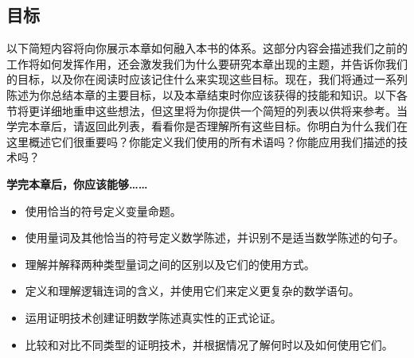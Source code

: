 \subsection{目标}

以下简短内容将向你展示本章如何融入本书的体系。这部分内容会描述我们之前的工作将如何发挥作用，还会激发我们为什么要研究本章出现的主题，并告诉你我们的目标，以及你在阅读时应该记住什么来实现这些目标。现在，我们将通过一系列陈述为你总结本章的主要目标，以及本章结束时你应该获得的技能和知识。以下各节将更详细地重申这些想法，但这里将为你提供一个简短的列表以供将来参考。当学完本章后，请返回此列表，看看你是否理解所有这些目标。你明白为什么我们在这里概述它们很重要吗？你能定义我们使用的所有术语吗？你能应用我们描述的技术吗？

\textbf{学完本章后，你应该能够……}

\begin{itemize}
    \item 使用恰当的符号定义变量命题。
    \item 使用量词及其他恰当的符号定义数学陈述，并识别不是适当数学陈述的句子。
    \item 理解并解释两种类型量词之间的区别以及它们的使用方式。
    \item 定义和理解逻辑连词的含义，并使用它们来定义更复杂的数学语句。
    \item 运用证明技术创建证明数学陈述真实性的正式论证。
    \item 比较和对比不同类型的证明技术，并根据情况了解何时以及如何使用它们。
\end{itemize}
